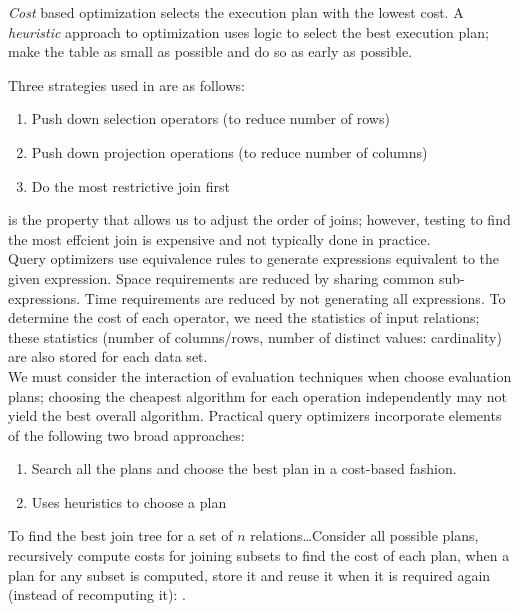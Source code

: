\documentclass{article}
\begin{document}
\begin{remark}
  \emph{Cost} based optimization selects the execution plan with the lowest cost. A \emph{heuristic} approach to optimization uses logic to select the best execution plan; make the table as small as possible and do so as early as possible.
\end{remark}

Three strategies used in  are as follows: 
\begin{enumerate}
  \item Push down selection operators (to reduce number of rows) 
  \item Push down projection operations (to reduce number of columns) 
  \item Do the most restrictive join first
\end{enumerate}

 is the property that allows us to adjust the order of joins; however, testing to find the most effcient join is expensive and not typically done in practice. \\ 

Query optimizers use equivalence rules to  generate expressions equivalent to the given expression. Space requirements are reduced by sharing common sub-expressions. Time requirements are reduced by not generating all expressions. To determine the cost of each operator, we need the statistics of input relations; these statistics (number of columns/rows, number of distinct values: cardinality) are also stored for each data set. \\ 

We must consider the interaction of evaluation techniques when choose evaluation plans; choosing the cheapest algorithm for each operation independently may not yield the best overall algorithm. Practical query optimizers incorporate elements of the following two broad approaches: 
\begin{enumerate}
  \item Search all the plans and choose the best plan in a cost-based fashion. 
  \item Uses heuristics to choose a plan
\end{enumerate}

To find the best join tree for a set of $n$ relations\dots Consider all possible plans, recursively compute costs for joining subsets to find the cost of each plan, when a plan for any subset is computed, store it and reuse it when it is required again (instead of recomputing it): . \\ 
\end{document}
